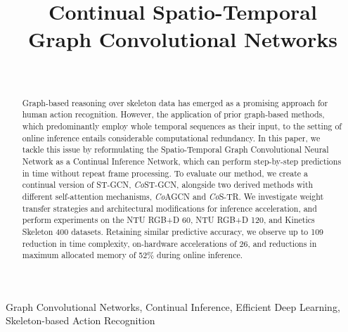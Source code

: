 \documentclass[journal]{IEEEtran}
\theoremstyle{definition}
\begin{document}
\title{Continual Spatio-Temporal\\Graph Convolutional Networks}





\author{
    \\
}





\maketitle





\begin{abstract}
Graph-based reasoning over skeleton data has emerged as a promising approach for human action recognition.
However, the application of prior graph-based methods, which predominantly employ whole temporal sequences as their input, to the setting of online inference entails considerable computational redundancy.
In this paper, we tackle this issue by reformulating the Spatio-Temporal Graph Convolutional Neural Network as a Continual Inference Network, which can perform step-by-step predictions in time without repeat frame processing.
To evaluate our method, we create a continual version of ST-GCN, \textit{Co}ST-GCN, alongside two derived methods with different self-attention mechanisms, \textit{Co}AGCN and \textit{Co}S-TR. We investigate weight transfer strategies and architectural modifications for inference acceleration, and perform experiments on the NTU RGB+D 60, NTU RGB+D 120, and Kinetics Skeleton 400 datasets. Retaining similar predictive accuracy, we observe up to 109 reduction in time complexity, on-hardware accelerations of 26, and reductions in maximum allocated memory of 52\% during online inference.
\end{abstract}

%
 
\begin{IEEEkeywords}
Graph Convolutional Networks, Continual Inference, Efficient Deep Learning, Skeleton-based Action Recognition
\end{IEEEkeywords}
\end{document}
